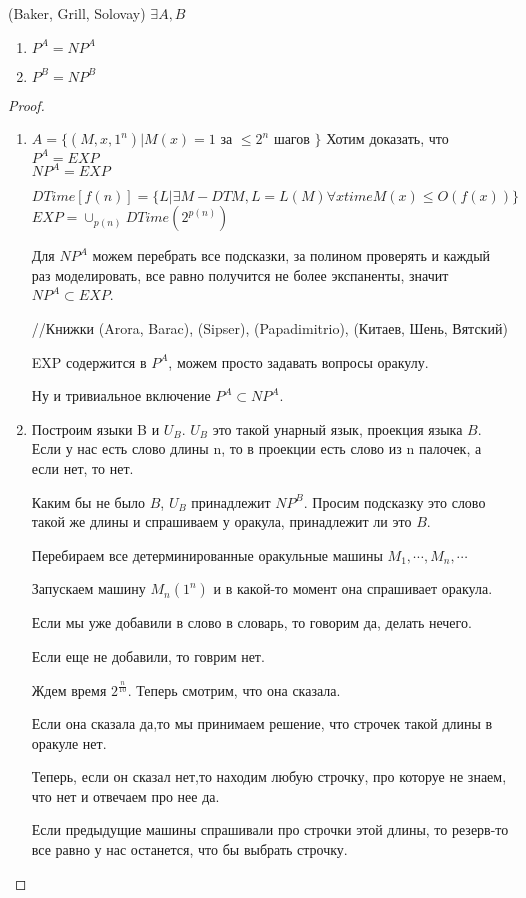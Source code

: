 ﻿\begin{theorem} (Baker, Grill, Solovay)
$\exists A, B$\\
\begin{enumerate}
\item $P^{A} = NP^{A}$\\
\item $P^{B} = NP^{B}$\\
\end{enumerate}
\end{theorem}
\begin{proof}
\begin{enumerate}
\item $A = \{(M, x, 1^{n})|M(x) = 1$ за $\le 2^n$ шагов $\}$
Хотим доказать, что 
$P^A = EXP$ \\
$NP^A = EXP$\\

\begin{Def}
$DTime[f(n)] = \{L|\exists M - DTM, L = L(M) \forall x time M(x) \le O(f(x))\}$\\
$EXP = \cup_{p(n)}DTime(2^{p(n)})$
\end{Def}

Для $NP^{A}$ можем перебрать все подсказки, за полином проверять и каждый раз моделировать,
все равно получится не более экспаненты, значит $NP^{A} \subset EXP$.

//Книжки (Arora, Barac), (Sipser), (Papadimitrio), (Китаев, Шень, Вятский)

EXP содержится в $P^A$, можем просто задавать вопросы оракулу. 

Ну и тривиальное включение $P^A \subset NP^{A}$.
\item 
Построим языки B и $U_B$.
$U_{B}$ это такой унарный язык, 
проекция языка $B$. Если у нас есть слово длины n, 
то в проекции есть слово из n палочек, а если нет, 
то нет.

Каким бы не было $B$, $U_B$ принадлежит $NP^{B}$. Просим подсказку
это слово такой же длины и спрашиваем у оракула, принадлежит ли это $B$.

Перебираем все детерминированные оракульные машины $M_1, \cdots, M_n, \cdots $

Запускаем машину $M_n(1^n)$ и в какой-то момент она спрашивает оракула. 

Если мы уже добавили в слово в словарь, то говорим да, делать нечего. 

Если еще не добавили, то говрим нет. 

Ждем время $2^{\frac{n}{10}}$. Теперь 
смотрим, что она сказала. 

Если она сказала да,то мы принимаем решение, что строчек такой длины в оракуле нет. 

Теперь, если он сказал нет,то находим любую строчку, про которуе не знаем, что нет и 
отвечаем про нее да. 

Если предыдущие машины спрашивали про строчки этой длины, то резерв-то все равно у нас останется, что
бы выбрать строчку.  
\end{enumerate}
\end{proof}

